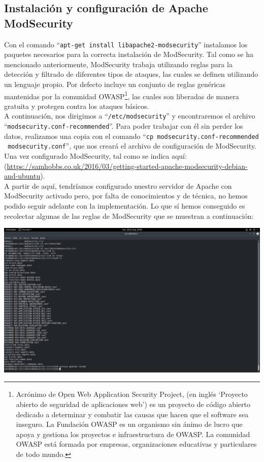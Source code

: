 \documentclass[12pt,letterpaper]{article}
\begin{document}
\subsection{Instalación y configuración de Apache ModSecurity}
Con el comando ``\texttt{apt-get install libapache2-modsecurity}'' instalamos los paquetes necesarios para la correcta instalación de ModSecurity. Tal como se ha mencionado anteriormente, ModSecurity trabaja utilizando reglas para la detección y filtrado de diferentes tipos de ataques, las cuales se definen utilizando un lenguaje propio. Por defecto incluye un conjunto de reglas genéricas mantenidas por la comunidad OWASP\footnote{Acrónimo de Open Web Application Security Project, (en inglés ‘Proyecto abierto de seguridad de aplicaciones web’) es un proyecto de código abierto dedicado a determinar y combatir las causas que hacen que el software sea inseguro. La Fundación OWASP es un organismo sin ánimo de lucro que apoya y gestiona los proyectos e infraestructura de OWASP. La comunidad OWASP está formada por empresas, organizaciones educativas y particulares de todo mundo.}, las cuales son liberadas de manera gratuita y protegen contra los ataques básicos.\\

A continuación, nos dirigimos a ``\texttt{/etc/modsecurity}'' y encontraremos el archivo\\``\texttt{modsecurity.conf-recommended}''. Para poder trabajar con él sin perder los datos, realizamos una copia con el comando ``\texttt{cp modsecurity.conf-recommended}\\\texttt{ modsecurity.conf}'', que nos creará el archivo de configuración de ModSecurity.\\

Una vez configurado ModSecurity, tal como se indica aquí: (\url{https://samhobbs.co.uk/2016/03/getting-started-apache-modsecurity-debian-and-ubuntu}).\\

A partir de aquí, tendríamos configurado nuestro servidor de Apache con ModSecurity activado pero, por falta de conocimientos y de técnica, no hemos podido seguir adelante con la implementación. Lo que sí hemos conseguido es recolectar algunas de las reglas de ModSecurity que se muestran a continuación:
\newpage
\begin{center}
	\includegraphics[scale=0.24]{reglas.png}
\end{center}
\end{document}
